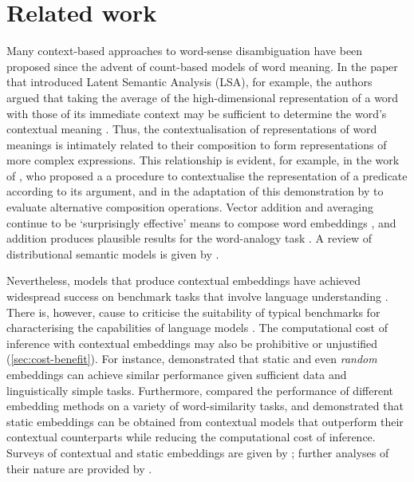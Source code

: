 \section{Related work}
\label{sec:related-work}

Many context-based approaches to word-sense disambiguation have been proposed since the
advent of count-based models of word meaning.
In the paper that introduced Latent Semantic Analysis (LSA), for example, the authors
argued that taking the average of the high-dimensional representation of a word with
those of its immediate context may be sufficient to determine the word's contextual
meaning \parencite[229-230]{Landauer1997}.
Thus, the contextualisation of representations of word meanings is intimately related
to their composition to form representations of more complex expressions.
This relationship is evident, for example, in the work of \textcite{Kintsch2001}, who
proposed a a procedure to contextualise the representation of a predicate according to
its argument, and in the adaptation of this demonstration by \textcite{Mitchell2008} to
evaluate alternative composition operations.
Vector addition and averaging continue to be `surprisingly effective' means to compose
word embeddings \parencite[10]{Boleda2020}, and addition produces plausible results for
the word-analogy task \parencites[e.g.,][9]{Mikolov2013}[7]{Mikolov2013a}.
A review of distributional semantic models is given by \textcite{Lenci2018}.

Nevertheless, models that produce contextual embeddings have achieved widespread
success on benchmark tasks that involve language understanding
\parencite[22-27]{Bommasani2022}.
There is, however, cause to criticise the suitability of typical benchmarks for
characterising the capabilities of language models \parencite[5-6]{Srivastava2023}.
The computational cost of inference with contextual embeddings may also be prohibitive
or unjustified (\cref{sec:cost-benefit}).
For instance, \textcite{Arora2020} demonstrated that static and even \emph{random}
embeddings can achieve similar performance given sufficient data and linguistically
simple tasks.
Furthermore, \textcites[5244-5246]{Gupta2019}[4760-4762]{Bommasani2020} compared the
performance of different embedding methods on a variety of word-similarity tasks, and
demonstrated that static embeddings can be obtained from contextual models that
outperform their contextual counterparts while reducing the computational cost of
inference.
Surveys of contextual and static embeddings are given by
\textcites{Liu2020}{Torregrossa2021}; further analyses of their nature are provided by
\textcites{Hewitt2019}{Liu2019}{Reif2019}{Brunner2020}.

